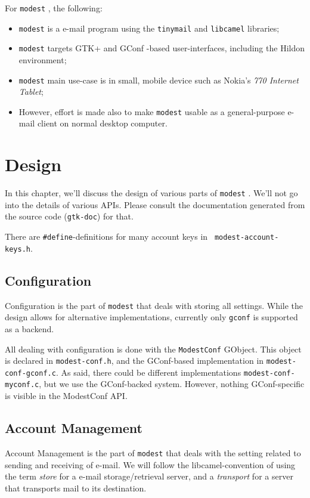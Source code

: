 \documentclass{book}
\newcommand{\modest}{{\tt modest} }
\newcommand{\tinymail}{{\tt tinymail} }
\newcommand{\camel}{{\tt libcamel} }
\newcommand{\gtk}{{\sc GTK+} }
\newcommand{\gconf}{{\sc GConf} }
\begin{document}
For \modest, the following:
\begin{itemize}
  \item \modest is a e-mail program using the \tinymail and \camel libraries;
  \item \modest targets \gtk and \gconf-based user-interfaces, including the Hildon
    environment;
  \item \modest main use-case is in small, mobile device such as Nokia's {\em 770
    Internet Tablet};
  \item However, effort is made also to make \modest usable as a
    general-purpose e-mail client on normal desktop computer.
\end{itemize}


\chapter{Design}
In this chapter, we'll discuss the design of various parts of \modest. We'll
not go into the details of various APIs. Please consult the documentation
generated from the source code ({\tt gtk-doc}) for that.

There are {\tt \#define}-definitions for many account keys in {\tt
  modest-account-keys.h}. 

\section {Configuration}
Configuration is the part of \modest that deals with storing all
settings. While the design allows for alternative implementations, currently
only {\tt gconf} is supported as a backend.

All dealing with configuration is done with the {\tt ModestConf} GObject. This
object is declared in {\tt modest-conf.h}, and the GConf-based implementation in
{\tt modest-conf-gconf.c}. As said, there could be different implementations
{\tt modest-conf-myconf.c}, but we use the GConf-backed system. However,
nothing GConf-specific is visible in the ModestConf API.

\section{Account Management}
Account Management is the part of \modest that deals with the setting related
to sending and receiving of e-mail. We will follow the libcamel-convention of
using the term {\em store} for a e-mail storage/retrieval server, and a {\em
  transport} for a server that transports mail to its destination.
\end{document}
